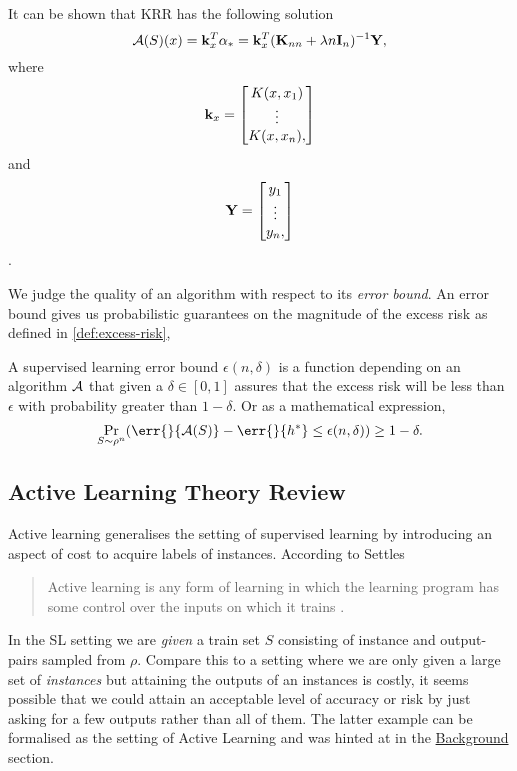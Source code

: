It can be shown that KRR has the following solution
\begin{equation}
\label{eq:krr-equation} \mathcal{A}(S)(x) = \mathbf{k}_{x}^{T} \mathbf{\alpha}_{\ast} =
\mathbf{k}_{x}^{T} (\mathbf{K}_{nn} + \lambda n \mathbf{I}_{n})^{-1}\mathbf{Y},
\end{equation} where
\begin{equation}
\label{eq:k-one-x} \mathbf{k}_{x} =
\begin{bmatrix} K(x, x_{1}) \\ \vdots \\ K(x, x_{n}), 
\end{bmatrix}
\end{equation} and
\begin{equation}
  \label{eq:y-mat} \mathbf{Y} =
  \begin{bmatrix} y_1 \\ \vdots \\ y_n, 
  \end{bmatrix}
\end{equation}
.

We judge the quality of an algorithm with respect to its \emph{error bound}. An
error bound gives us probabilistic guarantees on the magnitude of the excess
risk as defined in \ref{def:excess-risk},
\begin{definition}
  \label{def:error-bound-sl} A supervised learning error bound \(\epsilon(n,
\delta)\) is a function depending on an algorithm \(\mathcal{A}\) that given a
\(\delta \in [0, 1]\) assures that the excess risk will be less than
\(\epsilon\) with probability greater than \(1 - \delta\). Or as a mathematical
expression,
  \begin{equation} \Pr_{S \sim \rho^n}(\err{}{\algo(S)} - \err{}{h^{\ast}} \leq
\epsilon(n, \delta)) \geq 1 - \delta.
  \end{equation}
\end{definition}

\subsection{Active Learning Theory Review} Active learning generalises the
setting of supervised learning by introducing an aspect of cost to acquire
labels of instances. According to Settles
\begin{quote} Active learning is any form of learning in which the learning
program has some control over the inputs on which it trains
\cite{settles12_activ_learn}.
\end{quote} In the SL setting we are \emph{given} a train set \(S\) consisting
of instance and output-pairs sampled from \(\rho\). Compare this to a setting
where we are only given a large set of \emph{instances} but attaining the
outputs of an instances is costly, it seems possible that we could attain an
acceptable level of accuracy or risk by just asking for a few outputs rather
than all of them. The latter example can be formalised as the setting of Active
Learning and was hinted at in the \hyperref[sec:background]{Background} section.

